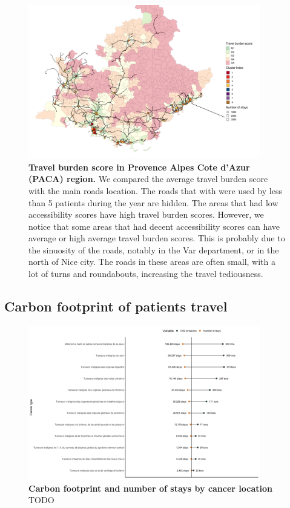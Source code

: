 \begin{figure}[h!]
    \includegraphics[width=0.9\textwidth]{images/routes/fig7.png}
    \centering
    \caption{
        \textbf{Travel burden score in Provence Alpes Cote d'Azur (PACA) region.}
        We compared the average travel burden score with the main roads
        location. The roads that with were used by less than 5 patients during
        the year are hidden. The areas that had low accessibility scores have
        high travel burden scores. However, we notice that some areas that had decent
        accessibility scores can have average or high average travel burden
        scores. This is probably due to the sinuosity of the roads, notably in
        the Var department, or in the north of Nice city. The roads in these
        areas are often small, with a lot of turns and roundabouts, increasing
        the travel tediousness. }
    \label{fig:travel-burden-paca}
\end{figure}

\subsection{Carbon footprint of patients travel}

\begin{figure}[h!]
    \includegraphics[width=0.9\textwidth]{images/routes/fig12.png}
    \centering
    \caption{
        \textbf{Carbon footprint and number of stays by cancer location}
        TODO }
    \label{fig:carbon-footprint-pathology}
\end{figure}

